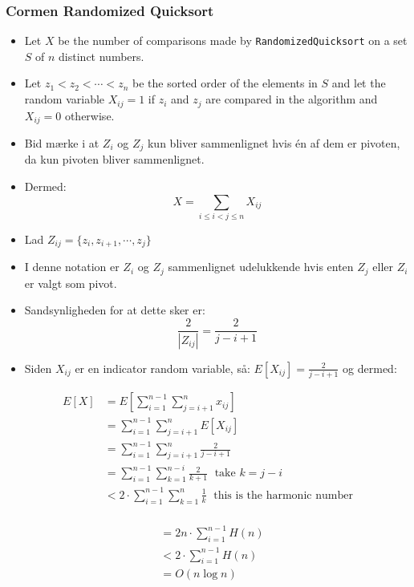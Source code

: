 \documentclass{beamer}
\begin{document}
\begin{frame}[allowframebreaks]
  \frametitle{Cormen Randomized Quicksort}
  \begin{itemize}
  \item Let $X$ be the number of comparisons made by \texttt{RandomizedQuicksort} on a set $S$ of $n$ distinct numbers. 
  \item Let $z_{1} < z_{2} < \cdots < z_{n}$ be the sorted order of the elements in $S$ and let the random variable $X_{ij} = 1$  if $z_{i}$ and $z_{j}$ are compared in the algorithm and $X_{ij} = 0$ otherwise.
  \item Bid mærke i at $Z_{i}$ og $Z_{j}$ kun bliver sammenlignet hvis én af dem er pivoten, da kun pivoten bliver sammenlignet. 
  \item Dermed: \[ X = \sum_{i \leq i < j \leq n} X_{ij} \]
  \item Lad $Z_{ij} = \{z_{i}, z_{i+1}, \cdots, z_{j}\}$ 
  \item I denne notation er $Z_i$ og $Z_{j}$ sammenlignet udelukkende hvis enten $Z_{j}$ eller $Z_{i}$ er valgt som pivot.
  \item Sandsynligheden for at dette sker er: \[ \frac{2}{|Z_{ij}|} = \frac{2}{j-i+1} \]
  \item Siden $X_{ij}$ er en indicator random variable, så: $E[X_{ij}] = \frac{2}{j-i+1}$ og dermed: 
  \end{itemize}

  \begin{equation}
    \begin{split}
      E[X] &= E[\sum_{i=1}^{n-1} \sum_{j=i+1}^{n}x_{ij}]\\
           &= \sum_{i=1}^{n-1} \sum_{j=i+1}^{n} E[X_{ij}]\\
           &= \sum_{i=1}^{n-1} \sum_{j=i+1}^{n} \frac{2}{j-i+1}\\
           &= \sum_{i=1}^{n-1} \sum_{k=1}^{n-i} \frac{2}{k+1}\;  \text{ take } k = j-i\\
           &< 2 \cdot \sum_{i=1}^{n-1} \sum_{k=1}^{n} \frac{1}{k}\; \text{ this is the harmonic number}\\
    \end{split}
  \end{equation}

  \begin{equation}
    \begin{split}
      &= 2n \cdot \sum_{i=1}^{n-1} H(n)\\
      &< 2\cdot \sum_{i=1}^{n-1}  H(n)\\
      &= O(n \log n)\\
    \end{split}
  \end{equation}
\end{frame}
\end{document}
